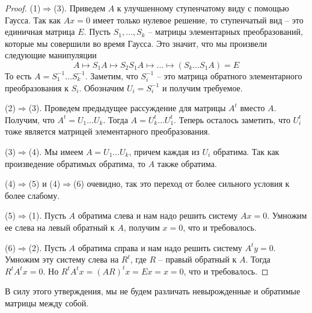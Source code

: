 \begin{proof}
(1)$\Rightarrow$(3).
Приведем $A$ к улучшенному ступенчатому виду с помощью Гаусса.
Так как $Ax = 0$ имеет только нулевое решение, то ступенчатый вид -- это единичная матрица $E$.
Пусть $S_1, \ldots, S_k$ -- матрицы элементарных преобразований, которые мы совершили во время Гаусса.
Это значит, что мы произвели следующие манипуляции
\[
A \mapsto S_1 A \mapsto S_2 S_1 A \mapsto \ldots \mapsto (S_k \ldots S_1 A) = E
\]
То есть $A = S_1^{-1}\ldots S_k^{-1}$.
Заметим, что $S_i^{-1}$ -- это матрица обратного элементарного преобразования к $S_i$.
Обозначим $U_i = S_i^{-1}$ и получим требуемое.

(2)$\Rightarrow$(3).
Проведем предыдущее рассуждение для матрицы $A^t$ вместо $A$.
Получим, что $A^t = U_1\ldots U_k$.
Тогда $A = U_k^t \ldots U_1^t$.
Теперь осталось заметить, что $U_i^t$ тоже является матрицей элементарного преобразования.

(3)$\Rightarrow$(4).
Мы имеем $A=U_1\ldots U_k$, причем каждая из $U_i$ обратима.
Так как произведение обратимых обратима, то $A$ также обратима.

(4)$\Rightarrow$(5) и (4)$\Rightarrow$(6) очевидно, так это переход от более сильного условия к более слабому.

(5)$\Rightarrow$(1).
Пусть $A$ обратима слева и нам надо решить систему $Ax = 0$.
Умножим ее слева на левый обратный к $A$, получим $x = 0$, что и требовалось.

(6)$\Rightarrow$(2).
Пусть $A$ обратима справа и нам надо решить систему $A^ty = 0$.
Умножим эту систему слева на $R^t$, где $R$ -- правый обратный к $A$.
Тогда $R^t A^t x = 0$.
Но $R^t A^t x = (AR)^tx = Ex = x = 0$, что и требовалось.
\end{proof}

В силу этого утверждения, мы не будем различать невырожденные и обратимые матрицы между собой.
